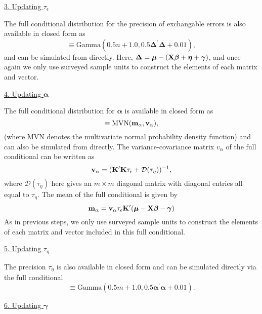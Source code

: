 \documentclass[12pt,fleqn]{article}
\begin{document}
\begin{flushleft}
\underline{3. Updating $\tau_\epsilon$}

The full conditional distribution for the precision of exchangable errors is also available in closed form as
\begin{equation*}
  [\tau_\epsilon | \cdot] \equiv \textrm{Gamma}(0.5n + 1.0,0.5 \boldsymbol{\Delta}^\prime \boldsymbol{\Delta} + 0.01),
\end{equation*}
and can be simulated from directly.
 Here, $\boldsymbol{\Delta} = \boldsymbol{\mu}- ({\bf X} \boldsymbol{\beta} + \boldsymbol{\eta} + \boldsymbol{\gamma})$, and once again we only use surveyed sample units to construct the elements of each matrix and vector.

\underline{4. Updating $\boldsymbol{\alpha}$}

The full conditional distribution for $\boldsymbol{\alpha}$ is available in closed form as
\begin{equation*}
  [\boldsymbol{\alpha} | \cdot] \equiv \textrm{MVN}({\bf m}_{\alpha},{\bf v}_{\alpha}),
\end{equation*}
(where MVN denotes the multivariate normal probability density function) and can also be simulated from directly.  The variance-covariance matrix $v_{\alpha}$ of the full conditional can be written as
\begin{equation*}
  {\bf v}_{\alpha} = ({\bf K}^{\prime}{\bf K} \tau_\epsilon + \mathcal{D}(\tau_\eta))^{-1},
\end{equation*}
where $\mathcal{D}(\tau_\eta)$ here gives an $m \times m$ diagonal matrix with diagonal entries all equal to $\tau_\eta$.  The mean of the full conditional is given by
\begin{equation*}
  {\bf m}_{\alpha} = {\bf v}_\alpha \tau_\epsilon {\bf K}^\prime (\boldsymbol{\mu}- {\bf X} \boldsymbol{\beta} - \boldsymbol{\gamma})
\end{equation*}
As in previous steps, we only use surveyed sample units to construct the elements of each matrix and vector included in this full conditional.

\underline{5. Updating $\tau_\eta$}

The precision $\tau_\eta$ is also available in closed form and can be simulated directly via the full conditional
\begin{equation*}
  [\tau_\eta | \cdot] \equiv \textrm{Gamma}(0.5m + 1.0,0.5 \boldsymbol{\alpha}^\prime \boldsymbol{\alpha} + 0.01).
\end{equation*}

\underline{6. Updating $\boldsymbol{\gamma}$}


\end{flushleft}
\end{document}
